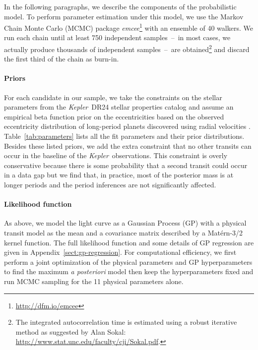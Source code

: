 \documentclass[manuscript, letterpaper]{aastex6}
\newcommand{\project}[1]{\textsl{#1}}
\newcommand{\kepler}{\project{Kepler}}
\newcommand{\emcee}{\project{emcee}}
\newcommand{\foreign}[1]{\emph{#1}}
\newcommand{\sectref}[1]{\ref{sect:#1}}
\newcommand{\App}[1]{Appendix~\sectref{#1}}
\newcommand{\app}[1]{\App{#1}}
\begin{document}
In the following paragraphs, we describe the components of the probabilistic
model.
To perform parameter estimation under this model, we use the Markov Chain
Monte Carlo (MCMC) package \emcee\footnote{\url{http://dfm.io/emcee}}
\citep{Foreman-Mackey:2013} with an ensemble of 40 walkers.
We run each chain until at least 750 independent samples~--~in most cases, we
actually produce thousands of independent samples~--~are obtained\footnote{The
integrated autocorrelation time is estimated using a robust iterative method
as suggested by Alan Sokal:
\url{http://www.stat.unc.edu/faculty/cji/Sokal.pdf}.} and discard the first
third of the chain as burn-in.


\paragraph{Priors}

For each candidate in our sample, we take the constraints on the stellar
parameters from the \kepler\ DR24 stellar properties catalog and assume an
empirical beta function prior on the eccentricities based on the observed
eccentricity distribution of long-period planets discovered using radial
velocities \citep{Kipping:2013}.
Table~\ref{tab:parameters} lists all the fit parameters and their prior
distributions.
Besides these listed priors, we add the extra constraint that no other
transits can occur in the baseline of the \kepler\ observations.
This constraint is overly conservative because there is some probability that
a second transit could occur in a data gap but we find that, in practice, most
of the posterior mass is at longer periods and the period inferences are not
significantly affected.

\paragraph{Likelihood function}

As above, we model the light curve as a Gaussian Process (GP) with a physical
transit model as the mean and a covariance matrix described by a Mat\'ern-3/2
kernel function.
The full likelihood function and some details of GP regression are given in
\app{gp-regression}.
For computational efficiency, we first perform a joint optimization of the
physical parameters and GP hyperparameters to find the maximum \foreign{a
posteriori} model then keep the hyperparameters fixed and run MCMC sampling
for the 11 physical parameters alone.
\end{document}
